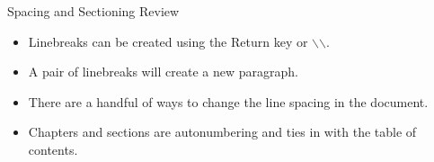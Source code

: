 \documentclass[pdf]{prosper}
\begin{document}
\begin{slide}{Spacing and Sectioning Review}
	\begin{itemize}
		\item Linebreaks can be created using the Return key or $\backslash$$\backslash$.
		\item A pair of linebreaks will create a new paragraph.
		\item There are a handful of ways to change the line spacing in the document.
		\item Chapters and sections are autonumbering and ties in with the table of contents.
	\end{itemize}
\end{slide}
\end{document}
